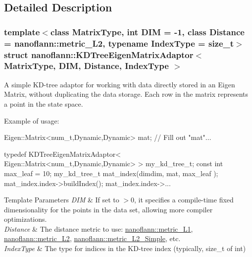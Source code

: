 \subsection{Detailed Description}
\subsubsection*{template$<$class Matrix\-Type, int D\-I\-M = -\/1, class Distance = nanoflann\-::metric\-\_\-\-L2, typename Index\-Type = size\-\_\-t$>$struct nanoflann\-::\-K\-D\-Tree\-Eigen\-Matrix\-Adaptor$<$ Matrix\-Type, D\-I\-M, Distance, Index\-Type $>$}

A simple K\-D-\/tree adaptor for working with data directly stored in an Eigen Matrix, without duplicating the data storage. Each row in the matrix represents a point in the state space.

Example of usage\-: 
\begin{DoxyCode}
Eigen::Matrix<num\_t,Dynamic,Dynamic>  mat;
\textcolor{comment}{// Fill out "mat"...}

\textcolor{keyword}{typedef} KDTreeEigenMatrixAdaptor< Eigen::Matrix<num\_t,Dynamic,Dynamic> >  my\_kd\_tree\_t;
\textcolor{keyword}{const} \textcolor{keywordtype}{int} max\_leaf = 10;
my\_kd\_tree\_t   mat\_index(dimdim, mat, max\_leaf );
mat\_index.index->buildIndex();
mat\_index.index->...
\end{DoxyCode}



\begin{DoxyTemplParams}{Template Parameters}
{\em D\-I\-M} & If set to $>$0, it specifies a compile-\/time fixed dimensionality for the points in the data set, allowing more compiler optimizations. \\
\hline
{\em Distance} & The distance metric to use\-: \hyperlink{structnanoflann_1_1metric___l1}{nanoflann\-::metric\-\_\-\-L1}, \hyperlink{structnanoflann_1_1metric___l2}{nanoflann\-::metric\-\_\-\-L2}, \hyperlink{structnanoflann_1_1metric___l2___simple}{nanoflann\-::metric\-\_\-\-L2\-\_\-\-Simple}, etc. \\
\hline
{\em Index\-Type} & The type for indices in the K\-D-\/tree index (typically, size\-\_\-t of int) \\
\hline
\end{DoxyTemplParams}


